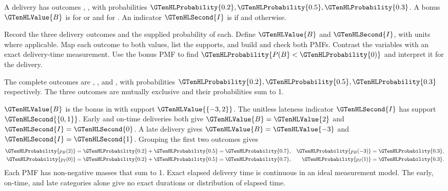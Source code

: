 A delivery has outcomes , ,  with probabilities $\GTenHLProbability{0.2},\GTenHLProbability{0.5},\GTenHLProbability{0.3}$. A bonus $\GTenHLValue{B}$ is  for  or  and  for . An indicator $\GTenHLSecond{I}$ is  if  and  otherwise.

    {Record the three delivery outcomes and the supplied probability of each.}
    {Define $\GTenHLValue{B}$ and $\GTenHLSecond{I}$, with units where applicable. Map each outcome to both values, list the supports, and build and check both PMFs. Contrast the variables with an exact delivery-time measurement.}
    {Use the bonus PMF to find $\GTenHLProbability{P(B}<\GTenHLProbability{0)}$ and interpret it for the delivery.}

The complete outcomes are , , and , with probabilities $\GTenHLProbability{0.2},\GTenHLProbability{0.5},\GTenHLProbability{0.3}$ respectively. The three outcomes are mutually exclusive and their probabilities sum to 1.

$\GTenHLValue{B}$ is the bonus in  with support $\GTenHLValue{\{-3,2\}}$. The unitless lateness indicator $\GTenHLSecond{I}$ has support $\GTenHLSecond{\{0,1\}}$. Early and on-time deliveries both give $\GTenHLValue{B}=\GTenHLValue{2}$ and $\GTenHLSecond{I}=\GTenHLSecond{0}$. A late delivery gives $\GTenHLValue{B}=\GTenHLValue{-3}$ and $\GTenHLSecond{I}=\GTenHLSecond{1}$. Grouping the first two outcomes gives
\[
\begin{aligned}
\GTenHLProbability{p_{B}(2)}&=\GTenHLProbability{0.2}+\GTenHLProbability{0.5}=\GTenHLProbability{0.7},
& \GTenHLProbability{p_{B}(-3)}&=\GTenHLProbability{0.3},\\
\GTenHLProbability{p_{I}(0)}&=\GTenHLProbability{0.2}+\GTenHLProbability{0.5}=\GTenHLProbability{0.7},
& \GTenHLProbability{p_{I}(1)}&=\GTenHLProbability{0.3}.
\end{aligned}
\]
Each PMF has non-negative masses that sum to 1. Exact elapsed delivery time is continuous in an ideal measurement model. The early, on-time, and late categories alone give no exact durations or distribution of elapsed time.

